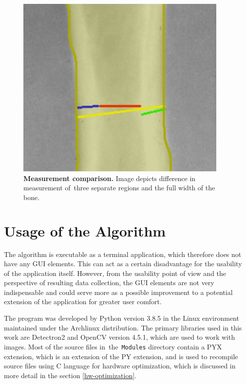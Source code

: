 \begin{figure}[ht]
    \centering
    \includegraphics[width=.5\textwidth]{obrazky-figures/measures_comparision.pdf}
    \caption{\textbf{Measurement comparison.} Image depicts difference in measurement of~three separate regions and the full width of the bone.}
    \label{measures-comparision}
\end{figure}




\section{Usage of the Algorithm}
\label{implementation}
The algorithm is executable as a terminal application, which therefore does not have any GUI elements. This can act as a certain disadvantage for the usability of the application itself. However, from the usability point of view and the perspective of resulting data collection, the GUI elements are not very indispensable and could serve more as a possible improvement to a potential extension of the application for greater user comfort.

The program was developed by Python version 3.8.5 in the Linux environment maintained under the Archlinux distribution. The primary libraries used in this work are Detectron2 and OpenCV version 4.5.1, which are used to work with images. Most of the source files in~the~\texttt{Modules} directory contain a PYX extension, which is an extension of the PY extension, and is used to recompile source files using C language for hardware optimization, which is discussed in more detail in the section \ref{hw-optimization}.

